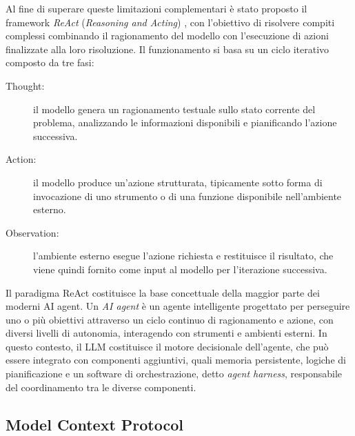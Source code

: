 

Al fine di superare queste limitazioni complementari è stato proposto il framework \emph{ReAct} (\emph{Reasoning and Acting}) \cite{yao2023react}, con l'obiettivo di risolvere compiti complessi combinando il ragionamento del modello con l'esecuzione di azioni finalizzate alla loro risoluzione. Il funzionamento si basa su un ciclo iterativo composto da tre fasi:

\begin{description}
    \item[Thought:] il modello genera un ragionamento testuale sullo stato corrente del problema, analizzando le informazioni disponibili e pianificando l'azione successiva.
    \item[Action:] il modello produce un'azione strutturata, tipicamente sotto forma di invocazione di uno strumento o di una funzione disponibile nell'ambiente esterno.
    \item[Observation:] l'ambiente esterno esegue l'azione richiesta e restituisce il risultato, che viene quindi fornito come input al modello per l'iterazione successiva.
\end{description}

Il paradigma ReAct costituisce la base concettuale della maggior parte dei moderni AI agent. Un \emph{AI agent} è un agente intelligente progettato per perseguire uno o più obiettivi attraverso un ciclo continuo di ragionamento e azione, con diversi livelli di autonomia, interagendo con strumenti e ambienti esterni. In questo contesto, il LLM costituisce il motore decisionale dell'agente, che può essere integrato con componenti aggiuntivi, quali memoria persistente, logiche di pianificazione e un software di orchestrazione, detto \emph{agent harness}, responsabile del coordinamento tra le diverse componenti. %


\subsection{Model Context Protocol} %

